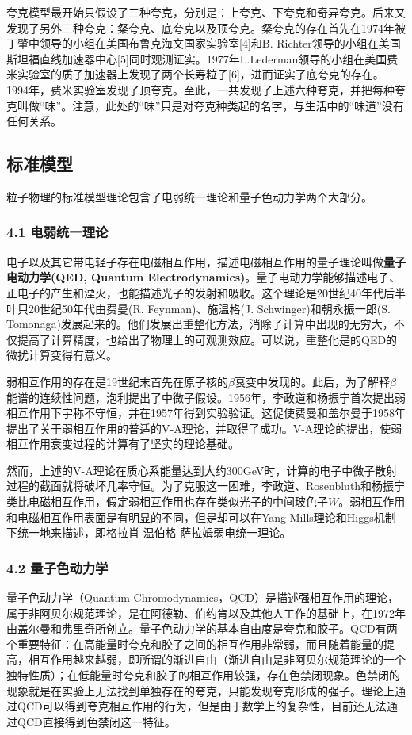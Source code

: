 夸克模型最开始只假设了三种夸克，分别是：上夸克、下夸克和奇异夸克。后来又发现了另外三种夸克：粲夸克、底夸克以及顶夸克。粲夸克的存在首先在1974年被丁肇中领导的小组在美国布鲁克海文国家实验室[4]和B. Richter领导的小组在美国斯坦福直线加速器中心[5]同时观测证实。1977年L.Lederman领导的小组在美国费米实验室的质子加速器上发现了两个长寿粒子[6]，进而证实了底夸克的存在。1994年，费米实验室发现了顶夸克。至此，一共发现了上述六种夸克，并把每种夸克叫做“味”。注意，此处的“味”只是对夸克种类起的名字，与生活中的“味道”没有任何关系。

\subsection{标准模型}
粒子物理的标准模型理论包含了电弱统一理论和量子色动力学两个大部分。

\subsubsection{4.1 电弱统一理论}
电子以及其它带电轻子存在电磁相互作用，描述电磁相互作用的量子理论叫做\textbf{量子电动力学(QED, Quantum Electrodynamics)}。量子电动力学能够描述电子、正电子的产生和湮灭，也能描述光子的发射和吸收。这个理论是20世纪40年代后半叶只20世纪50年代由费曼(R. Feynman)、施温格(J. Schwinger)和朝永振一郎(S. Tomonaga)发展起来的。他们发展出重整化方法，消除了计算中出现的无穷大，不仅提高了计算精度，也给出了物理上的可观测效应。可以说，重整化是的QED的微扰计算变得有意义。

弱相互作用的存在是19世纪末首先在原子核的$\beta$衰变中发现的。此后，为了解释$\beta$能谱的连续性问题，泡利提出了中微子假设。1956年，李政道和杨振宁首次提出弱相互作用下宇称不守恒，并在1957年得到实验验证。这促使费曼和盖尔曼于1958年提出了关于弱相互作用的普适的V-A理论，并取得了成功。V-A理论的提出，使弱相互作用衰变过程的计算有了坚实的理论基础。

然而，上述的V-A理论在质心系能量达到大约300GeV时，计算的电子中微子散射过程的截面就将破坏几率守恒。为了克服这一困难，李政道、Rosenbluth和杨振宁类比电磁相互作用，假定弱相互作用也存在类似光子的中间玻色子$W$。弱相互作用和电磁相互作用表面是有明显的不同，但是却可以在Yang-Mills理论和Higgs机制下统一地来描述，即格拉肖-温伯格-萨拉姆弱电统一理论。

\subsubsection{4.2 量子色动力学}
量子色动力学（Quantum Chromodynamics，QCD）是描述强相互作用的理论，属于非阿贝尔规范理论，是在阿德勒、伯约肯以及其他人工作的基础上，在1972年由盖尔曼和弗里奇所创立。量子色动力学的基本自由度是夸克和胶子。QCD有两个重要特征：在高能量时夸克和胶子之间的相互作用非常弱，而且随着能量的提高，相互作用越来越弱，即所谓的渐进自由（渐进自由是非阿贝尔规范理论的一个独特性质）；在低能量时夸克和胶子的相互作用较强，存在色禁闭现象。色禁闭的现象就是在实验上无法找到单独存在的夸克，只能发现夸克形成的强子。理论上通过QCD可以得到夸克相互作用的行为，但是由于数学上的复杂性，目前还无法通过QCD直接得到色禁闭这一特征。

